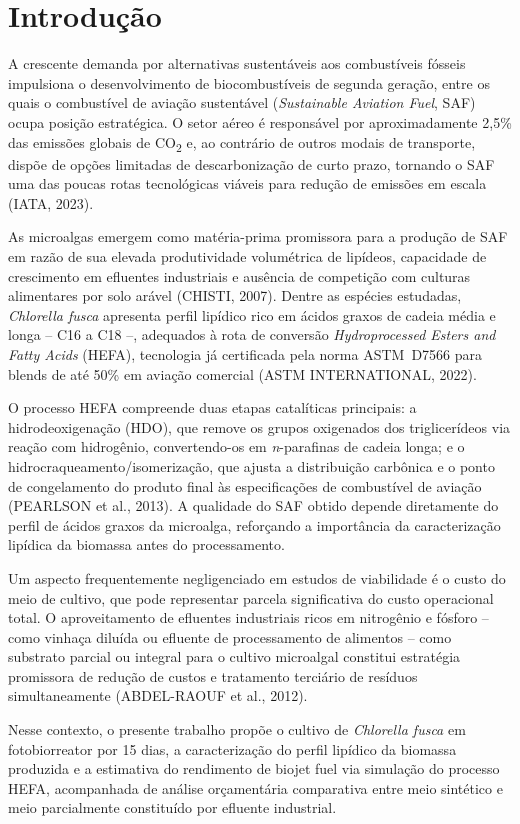 
\section{Introdução}

A crescente demanda por alternativas sustentáveis aos combustíveis fósseis
impulsiona o desenvolvimento de biocombustíveis de segunda geração, entre
os quais o combustível de aviação sustentável (\textit{Sustainable Aviation
Fuel}, SAF) ocupa posição estratégica. O setor aéreo é responsável por
aproximadamente 2,5\% das emissões globais de CO\textsubscript{2} e, ao
contrário de outros modais de transporte, dispõe de opções limitadas de
descarbonização de curto prazo, tornando o SAF uma das poucas rotas
tecnológicas viáveis para redução de emissões em escala (IATA, 2023).

As microalgas emergem como matéria-prima promissora para a produção de SAF
em razão de sua elevada produtividade volumétrica de lipídeos, capacidade de
crescimento em efluentes industriais e ausência de competição com culturas
alimentares por solo arável (CHISTI, 2007). Dentre as espécies estudadas,
\textit{Chlorella fusca} apresenta perfil lipídico rico em ácidos graxos de
cadeia média e longa -- C16 a C18 --, adequados à rota de conversão
\textit{Hydroprocessed Esters and Fatty Acids} (HEFA), tecnologia já
certificada pela norma ASTM~D7566 para blends de até 50\% em aviação
comercial (ASTM INTERNATIONAL, 2022).

O processo HEFA compreende duas etapas catalíticas principais: a
hidrodeoxigenação (HDO), que remove os grupos oxigenados dos triglicerídeos
via reação com hidrogênio, convertendo-os em \textit{n}-parafinas de cadeia
longa; e o hidrocraqueamento/isomerização, que ajusta a distribuição
carbônica e o ponto de congelamento do produto final às especificações de
combustível de aviação (PEARLSON et al., 2013). A qualidade do SAF obtido
depende diretamente do perfil de ácidos graxos da microalga, reforçando a
importância da caracterização lipídica da biomassa antes do processamento.

Um aspecto frequentemente negligenciado em estudos de viabilidade é o custo
do meio de cultivo, que pode representar parcela significativa do custo
operacional total. O aproveitamento de efluentes industriais ricos em
nitrogênio e fósforo -- como vinhaça diluída ou efluente de processamento de
alimentos -- como substrato parcial ou integral para o cultivo microalgal
constitui estratégia promissora de redução de custos e tratamento terciário
de resíduos simultaneamente (ABDEL-RAOUF et al., 2012).

Nesse contexto, o presente trabalho propõe o cultivo de \textit{Chlorella
fusca} em fotobiorreator por 15 dias, a caracterização do perfil lipídico da
biomassa produzida e a estimativa do rendimento de biojet fuel via simulação
do processo HEFA, acompanhada de análise orçamentária comparativa entre meio
sintético e meio parcialmente constituído por efluente industrial.

